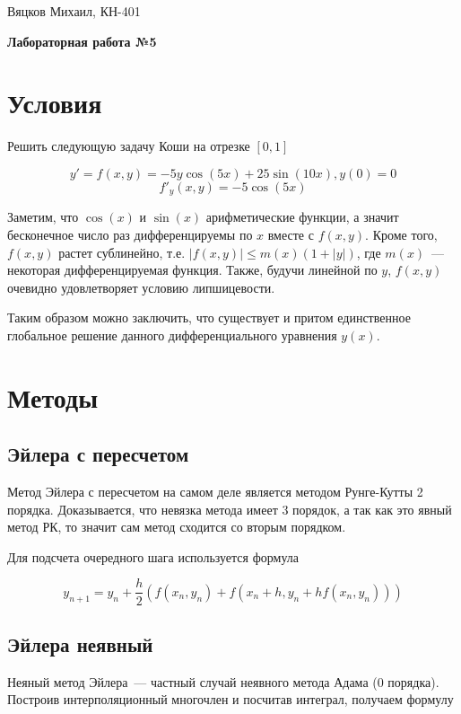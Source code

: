\documentclass[11pt,a4paper,oneside]{article}
\begin{document}
\begin{center}
	{Вяцков Михаил, КН-401}
	
	{\huge \bf Лабораторная работа №5}
\end{center}

\section{Условия}

Решить следующую задачу Коши на отрезке $[0, 1]$

$$ y' = f(x, y) = -5 y \cos(5 x) + 25 \sin(10 x), y(0) = 0 $$
$$ f'_y(x, y) = -5 \cos(5 x) $$

Заметим, что $\cos(x)$ и $\sin(x)$ арифметические функции, а значит бесконечное число раз дифференцируемы  по $x$ вместе с $f(x, y)$. Кроме того, $f(x, y)$ растет сублинейно, т.е. $\left| f(x, y) \right| \le m(x) (1 + |y|)$, где $m(x)$~--- некоторая дифференцируемая функция. Также, будучи линейной по $y$, $f(x, y)$ очевидно удовлетворяет условию липшицевости.

Таким образом можно заключить, что существует и притом единственное глобальное решение данного дифференциального уравнения $y(x)$.

\section{Методы}

\subsection{Эйлера с пересчетом}

Метод Эйлера с пересчетом на самом деле является методом Рунге-Кутты 2 порядка. Доказывается, что невязка метода имеет 3 порядок, а так как это явный метод РК, то значит сам метод сходится со вторым порядком.

Для подсчета очередного шага используется формула

$$ y_{n + 1} = y_n + \frac{h}{2} \left( f(x_n, y_n) + f(x_n + h, y_n + h f(x_n, y_n)) \right) $$

\subsection{Эйлера неявный}

Неяный метод Эйлера~--- частный случай неявного метода Адама (0 порядка). Построив интерполяционный многочлен и посчитав интеграл, получаем формулу
\end{document}
